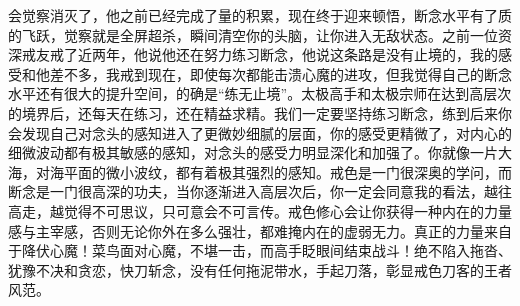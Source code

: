 \begin{case}
会觉察消灭了，他之前已经完成了量的积累，现在终于迎来顿悟，断念水平有了质的飞跃，觉察就是全屏超杀，瞬间清空你的头脑，让你进入无敌状态。之前一位资深戒友戒了近两年，他说他还在努力练习断念，他说这条路是没有止境的，我的感受和他差不多，我戒到现在，即使每次都能击溃心魔的进攻，但我觉得自己的断念水平还有很大的提升空间，的确是“练无止境”。太极高手和太极宗师在达到高层次的境界后，还每天在练习，还在精益求精。我们一定要坚持练习断念，练到后来你会发现自己对念头的感知进入了更微妙细腻的层面，你的感受更精微了，对内心的细微波动都有极其敏感的感知，对念头的感受力明显深化和加强了。你就像一片大海，对海平面的微小波纹，都有着极其强烈的感知。戒色是一门很深奥的学问，而断念是一门很高深的功夫，当你逐渐进入高层次后，你一定会同意我的看法，越往高走，越觉得不可思议，只可意会不可言传。戒色修心会让你获得一种内在的力量感与主宰感，否则无论你外在多么强壮，都难掩内在的虚弱无力。真正的力量来自于降伏心魔！菜鸟面对心魔，不堪一击，而高手眨眼间结束战斗！绝不陷入拖沓、犹豫不决和贪恋，快刀斩念，没有任何拖泥带水，手起刀落，彰显戒色刀客的王者风范。
\end{case}


